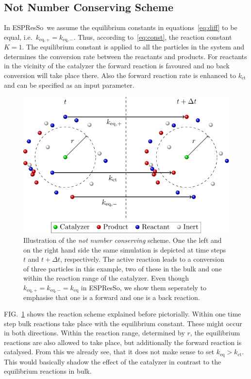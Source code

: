 \documentclass[aip,jcp,reprint,a4paper,onecolumn,nofootinbib,amsmath,amssymb]{revtex4-1}
\newcommand{\es}{\mbox{\textsf{ESPResSo}}\xspace}
\begin{document}
\subsection{Not Number Conserving Scheme}

In \es\ we assume the equilibrium constants in
equations~\eqref{eq:diff} to be equal, i.e.~$k_{\text{eq},+} =
k_{\text{eq},-}$.  Thus, according to~\eqref{eq:const}, the reaction
constant $K = 1$.  The equilibrium constant is applied to all the
particles in the system and determines the conversion rate between the
reactants and products.  For reactants in the vicinity of the
catalyzer the forward reaction is favoured and no back conversion will
take place there.  Also the forward reaction rate is enhanced to
$k_{\text{ct}}$ and can be specified as an input parameter.

\begin{figure}
  \centering
  \includegraphics{FIGURES/non-number-conserving}
  \caption{Illustration of the \emph{not number conserving} scheme.
    One the left and on the right hand side the same simulation is
    depicted at time steps $t$ and $t+\Delta t$, respectively.  The
    active reaction leads to a conversion of three particles in this
    example, two of these in the bulk and one within the reaction
    range of the catalyzer.  Even though $k_{\text{eq},+} =
    k_{\text{eq},-} = k_{\text{eq}}$ in \es, we show them seperately
    to emphasise that one is a forward and one is a back reaction.}
  \label{fig:nnc}
\end{figure}

FIG.~\ref{fig:nnc} shows the reaction scheme explained before
pictorially.  Within one time step bulk reactions take place with the
equilibrium constant.  These might occur in both directions.  Within
the reaction range, determined by $r$, the equilibrium reactions are
also allowed to take place, but additionally the forward reaction is
catalysed.  From this we already see, that it does not make sense to
set $k_{\text{eq}} > k_{\text{ct}}$.  This would basically shadow the
effect of the catalyzer in contrast to the equilibrium reactions in
bulk.
\end{document}
